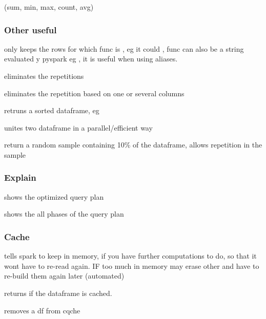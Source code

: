 				\code(sum, min, max, count, avg)







		\subsubsection{Other useful}

			 only keeps the rows for which func is , eg it could , func can also be a string evaluated y pyspark eg , it is useful when using aliases.

			 eliminates the repetitions

			 eliminates the repetition based on one or several columns

			 retruns a sorted dataframe, eg 

			 unites two dataframe in a parallel/efficient way

			 return a random sample containing 10\% of the dataframe,  allows repetition in the sample

		\subsubsection{Explain}


			 shows the optimized query plan 

			 shows the all phases of the query plan 

		\subsubsection{Cache}

			 tells spark to keep in memory, if you have further computations to do, so that it wont have to re-read again. IF too much in memory may erase other and have to re-build them again later (automated)

			 returns  if the dataframe is cached.

			 removes a df from cqche

